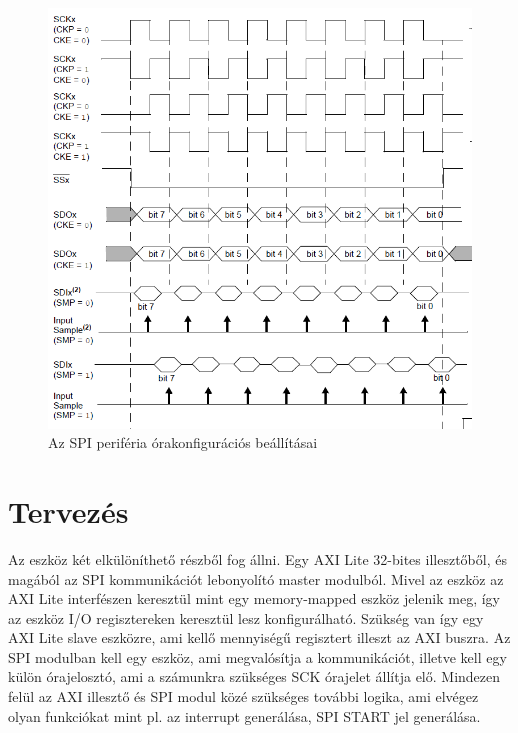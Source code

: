 \documentclass[a4paper,11pt]{article}
\begin{document}
\begin{figure}[H]
	\begin{center}
	\includegraphics[scale=2]{spi_clkdiag.png}
	\caption{Az SPI periféria órakonfigurációs beállításai}
	\label{fig:spi_clkdiag}
	\end{center}
\end{figure}

\section{Tervezés}
Az eszköz két elkülöníthető részből fog állni. Egy AXI Lite 32-bites illesztőből, és magából az SPI kommunikációt lebonyolító master modulból. Mivel az eszköz az AXI Lite interfészen keresztül mint egy memory-mapped eszköz jelenik meg, így az eszköz I/O regisztereken keresztül lesz konfigurálható. Szükség van így egy AXI Lite slave eszközre, ami kellő mennyiségű regisztert illeszt az AXI buszra. Az SPI modulban kell egy eszköz, ami megvalósítja a kommunikációt, illetve kell egy külön órajelosztó, ami a számunkra szükséges SCK órajelet állítja elő. Mindezen felül az AXI illesztő és SPI modul közé szükséges további logika, ami elvégez olyan funkciókat mint pl. az interrupt generálása, SPI START jel generálása.
\end{document}
